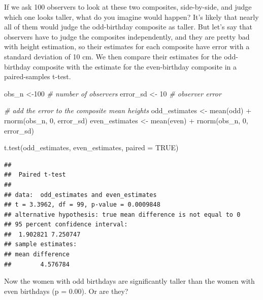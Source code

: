 \documentclass[
  man,floatsintext]{apa6}
\newenvironment{Shaded}{\begin{snugshade}}{\end{snugshade}}
\newcommand{\AttributeTok}[1]{\textcolor[rgb]{0.77,0.63,0.00}{#1}}
\newcommand{\CommentTok}[1]{\textcolor[rgb]{0.56,0.35,0.01}{\textit{#1}}}
\newcommand{\ConstantTok}[1]{\textcolor[rgb]{0.00,0.00,0.00}{#1}}
\newcommand{\DecValTok}[1]{\textcolor[rgb]{0.00,0.00,0.81}{#1}}
\newcommand{\FunctionTok}[1]{\textcolor[rgb]{0.00,0.00,0.00}{#1}}
\newcommand{\NormalTok}[1]{#1}
\newcommand{\OtherTok}[1]{\textcolor[rgb]{0.56,0.35,0.01}{#1}}
\newcommand{\SpecialCharTok}[1]{\textcolor[rgb]{0.00,0.00,0.00}{#1}}
\begin{document}
If we ask 100 observers to look at these two composites, side-by-side, and judge which one looks taller, what do you imagine would happen? It's likely that nearly all of them would judge the odd-birthday composite as taller. But let's say that observers have to judge the composites independently, and they are pretty bad with height estimation, so their estimates for each composite have error with a standard deviation of 10 cm. We then compare their estimates for the odd-birthday composite with the estimate for the even-birthday composite in a paired-samples t-test.

\begin{Shaded}
\begin{Highlighting}[]
\NormalTok{obs\_n }\OtherTok{\textless{}{-}}\DecValTok{100} \CommentTok{\# number of observers}
\NormalTok{error\_sd }\OtherTok{\textless{}{-}} \DecValTok{10} \CommentTok{\# observer error}

\CommentTok{\# add the error to the composite mean heights}
\NormalTok{odd\_estimates }\OtherTok{\textless{}{-}} \FunctionTok{mean}\NormalTok{(odd) }\SpecialCharTok{+} \FunctionTok{rnorm}\NormalTok{(obs\_n, }\DecValTok{0}\NormalTok{, error\_sd)}
\NormalTok{even\_estimates }\OtherTok{\textless{}{-}} \FunctionTok{mean}\NormalTok{(even) }\SpecialCharTok{+} \FunctionTok{rnorm}\NormalTok{(obs\_n, }\DecValTok{0}\NormalTok{, error\_sd)}

\FunctionTok{t.test}\NormalTok{(odd\_estimates, even\_estimates, }\AttributeTok{paired =} \ConstantTok{TRUE}\NormalTok{)}
\end{Highlighting}
\end{Shaded}

\begin{verbatim}
## 
##  Paired t-test
## 
## data:  odd_estimates and even_estimates
## t = 3.3962, df = 99, p-value = 0.0009848
## alternative hypothesis: true mean difference is not equal to 0
## 95 percent confidence interval:
##  1.902821 7.250747
## sample estimates:
## mean difference 
##        4.576784
\end{verbatim}

Now the women with odd birthdays are significantly taller than the women with even birthdays (p = 0.00). Or are they?
\end{document}
